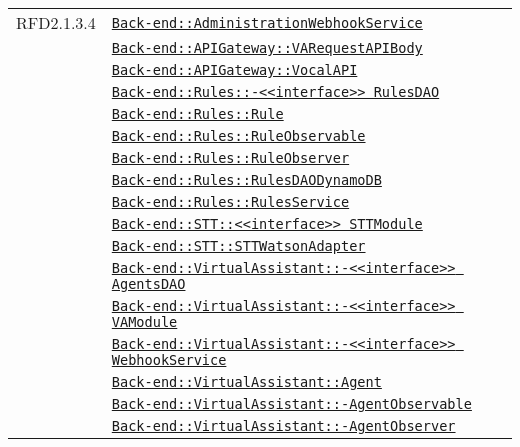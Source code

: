 \begin{longtable}{|>{\centering}m{3cm}|m{10cm}<{\centering}|}
RFD2.1.3.4 & \hyperref[Back-end::AdministrationWebhookService]{\texttt{Back-end::AdministrationWebhookService}}\\
& \hyperref[Back-end::APIGateway::VARequestAPIBody]{\texttt{Back-end::APIGateway::VARequestAPIBody}}\\
& \hyperref[Back-end::APIGateway::VocalAPI]{\texttt{Back-end::APIGateway::VocalAPI}}\\
& \hyperref[Back-end::Rules::<<interface>> RulesDAO]{\texttt{Back-end::Rules::-\linebreak <<interface>> RulesDAO}}\\
& \hyperref[Back-end::Rules::Rule]{\texttt{Back-end::Rules::Rule}}\\
& \hyperref[Back-end::Rules::RuleObservable]{\texttt{Back-end::Rules::RuleObservable}}\\
& \hyperref[Back-end::Rules::RuleObserver]{\texttt{Back-end::Rules::RuleObserver}}\\
& \hyperref[Back-end::Rules::RulesDAODynamoDB]{\texttt{Back-end::Rules::RulesDAODynamoDB}}\\
& \hyperref[Back-end::Rules::RulesService]{\texttt{Back-end::Rules::RulesService}}\\
& \hyperref[Back-end::STT::<<interface>> STTModule]{\texttt{Back-end::STT::<<interface>> STTModule}}\\
& \hyperref[Back-end::STT::STTWatsonAdapter]{\texttt{Back-end::STT::STTWatsonAdapter}}\\
& \hyperref[Back-end::VirtualAssistant::<<interface>> AgentsDAO]{\texttt{Back-end::VirtualAssistant::-\linebreak <<interface>> AgentsDAO}}\\
& \hyperref[Back-end::VirtualAssistant::<<interface>> VAModule]{\texttt{Back-end::VirtualAssistant::-\linebreak <<interface>> VAModule}}\\
& \hyperref[Back-end::VirtualAssistant::<<interface>> WebhookService]{\texttt{Back-end::VirtualAssistant::-\linebreak <<interface>> WebhookService}}\\
& \hyperref[Back-end::VirtualAssistant::Agent]{\texttt{Back-end::VirtualAssistant::Agent}}\\
& \hyperref[Back-end::VirtualAssistant::AgentObservable]{\texttt{Back-end::VirtualAssistant::-\linebreak AgentObservable}}\\
& \hyperref[Back-end::VirtualAssistant::AgentObserver]{\texttt{Back-end::VirtualAssistant::-\linebreak AgentObserver}}\\

\end{longtable}
